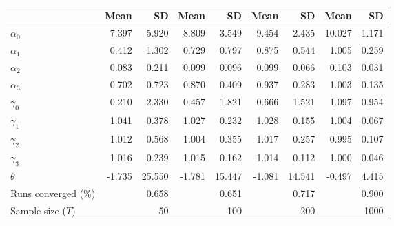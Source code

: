 
\begin{tabular}[t]{lrrrrrrrr}
\toprule
  & Mean & SD & Mean  & SD  & Mean   & SD   & Mean    & SD   \\
\midrule
$\alpha_{0}$ & 7.397 & 5.920 & 8.809 & 3.549 & 9.454 & 2.435 & 10.027 & 1.171\\
$\alpha_{1}$ & 0.412 & 1.302 & 0.729 & 0.797 & 0.875 & 0.544 & 1.005 & 0.259\\
$\alpha_{2}$ & 0.083 & 0.211 & 0.099 & 0.096 & 0.099 & 0.066 & 0.103 & 0.031\\
$\alpha_{3}$ & 0.702 & 0.723 & 0.870 & 0.409 & 0.937 & 0.283 & 1.003 & 0.135\\
$\gamma_{0}$ & 0.210 & 2.330 & 0.457 & 1.821 & 0.666 & 1.521 & 1.097 & 0.954\\
$\gamma_{1}$ & 1.041 & 0.378 & 1.027 & 0.232 & 1.028 & 0.155 & 1.004 & 0.067\\
$\gamma_{2}$ & 1.012 & 0.568 & 1.004 & 0.355 & 1.017 & 0.257 & 0.995 & 0.107\\
$\gamma_{3}$ & 1.016 & 0.239 & 1.015 & 0.162 & 1.014 & 0.112 & 1.000 & 0.046\\
$\theta$ & -1.735 & 25.550 & -1.781 & 15.447 & -1.081 & 14.541 & -0.497 & 4.415\\
Runs converged (\%) &  & 0.658 &  & 0.651 &  & 0.717 &  & 0.900\\
Sample size ($T$) &  & 50 &  & 100 &  & 200 &  & 1000\\
\bottomrule
\end{tabular}
